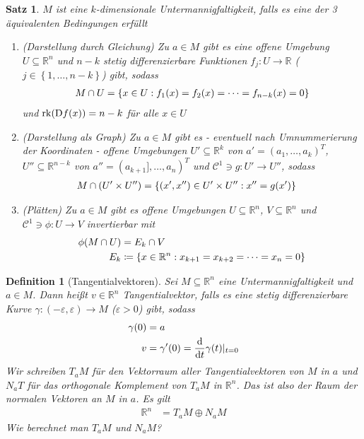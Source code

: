 \documentclass[11pt, twoside, a4paper]{article}
\theoremstyle{plain}
\newtheorem{definition}[blockelement]{Definition}
\newtheorem{satz}[blockelement]{Satz}
\numberwithin{equation}{subsection}
\newcommand{\set}[1]{\left\{#1\right\}}
\newcommand{\pair}[1]{\left(#1\right)}
\newcommand{\of}[1]{\mathopen{}\mathclose{}\bgroup\left(#1\aftergroup\egroup\right)}
\newcommand{\dif}{\mathop{}\!\mathrm{d}}
\DeclareMathOperator{\D}{D\!}
\DeclareMathOperator{\rank}{rk}
\newcommand{\R}{\mathbb{R}}
\newcommand{\mC}{\mathcal{C}}
\begin{document}
    \begin{satz} %
        $M$ ist eine $k$-dimensionale Untermannigfaltigkeit, falls es eine der 3 äquivalenten Bedingungen erfüllt
        \begin{enumerate}[label=(\roman*)]
            \item (Darstellung durch Gleichung) Zu $a\in M$ gibt es eine offene Umgebung $U\subseteq\R^n$ und $n-k$ stetig differenzierbare Funktionen $f_j: U\to\R$ ($j\in\set{1, \ldots, n-k}$) gibt, sodass
            \begin{align*}
                M\cap U = \set{x\in U: f_1\of{x} = f_2\of{x} = \dots = f_{n-k}\of{x} = 0}
            \end{align*}
            und $\rank\of{\D f\of{x}} = n-k$ für alle $x\in U$
            \item (Darstellung als Graph) Zu $a\in M$ gibt es - eventuell nach Umnummerierung der Koordinaten - offene Umgebungen $U'\subseteq\R^k$ von $a' = \pair{a_1, \ldots, a_k}^T$, $U''\subseteq\R^{n-k}$ von $a'' = \pair{a_{k+1}], \ldots, a_n}^{T}$ und $\mC^1\ni g: U'\to U''$, sodass
            \begin{align*}
                M\cap \pair{U'\times U''} &= \set{\pair{x', x''}\in U'\times U'': x'' = g\of{x'}}
            \end{align*}
            \item (Plätten) Zu $a\in M$ gibt es offene Umgebungen $U\subseteq\R^n$, $V\subseteq\R^n$ und $\mC^1\ni\phi: U\to V$ invertierbar mit
            \begin{align*}
                \phi\of{M\cap U} &= E_k \cap V\\
                E_k &\coloneqq \set{x\in\R^n: x_{k+1} = x_{k+2} = \dots = x_n = 0}
            \end{align*}
        \end{enumerate}
    \end{satz}

    \begin{definition}[Tangentialvektoren]
        Sei $M\subseteq\R^n$ eine Untermannigfaltigkeit und $a\in M$. Dann heißt $v\in\R^n$ Tangentialvektor, falls es eine stetig differenzierbare Kurve $\gamma: \pair{-\varepsilon, \varepsilon} \to M$ ($\varepsilon > 0$) gibt, sodass
        \begin{align*}
            \gamma\of{0} &= a\\
            v &= \gamma'\of{0} = \frac{\dif}{\dif t} \gamma\of{t}\vert_{t=0}
        \end{align*}
        Wir schreiben $T_a M$ für den Vektorraum aller Tangentialvektoren von $M$ in $a$ und $N_{a}T$ für das orthogonale Komplement von $T_a M$ in $\R^n$. Das ist also der Raum der normalen Vektoren an $M$ in $a$. Es gilt
        \begin{align*}
            \R^n &= T_a M \oplus N_a M
        \end{align*}
        Wie berechnet man $T_a M$ und $N_a M$?
    \end{definition}
\end{document}
